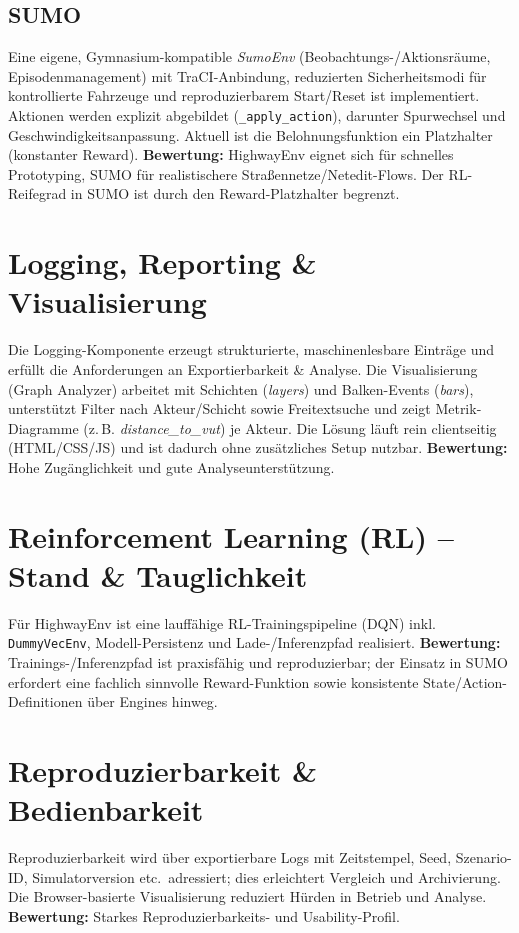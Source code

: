 \subsection*{SUMO}
Eine eigene, Gymnasium-kompatible \emph{SumoEnv} (Beobachtungs-/Aktionsräume, Episodenmanagement) mit TraCI-Anbindung, reduzierten Sicherheitsmodi für kontrollierte Fahrzeuge und reproduzierbarem Start/Reset ist implementiert.
Aktionen werden explizit abgebildet (\texttt{\_apply\_action}), darunter Spurwechsel und Geschwindigkeitsanpassung.
Aktuell ist die Belohnungsfunktion ein Platzhalter (konstanter Reward).
\textbf{Bewertung:} HighwayEnv eignet sich für schnelles Prototyping, SUMO für realistischere Straßennetze/Netedit-Flows.
Der RL-Reifegrad in SUMO ist durch den Reward-Platzhalter begrenzt.

\section{Logging, Reporting \& Visualisierung}
Die Logging-Komponente erzeugt strukturierte, maschinenlesbare Einträge und erfüllt die Anforderungen an Exportierbarkeit \& Analyse.
Die Visualisierung (Graph Analyzer) arbeitet mit Schichten (\emph{layers}) und Balken-Events (\emph{bars}), unterstützt Filter nach Akteur/Schicht sowie Freitextsuche und zeigt Metrik-Diagramme (z.\,B. \textit{distance\_to\_vut}) je Akteur.
Die Lösung läuft rein clientseitig (HTML/CSS/JS) und ist dadurch ohne zusätzliches Setup nutzbar.
\textbf{Bewertung:} Hohe Zugänglichkeit und gute Analyseunterstützung.

\section{Reinforcement Learning (RL) – Stand \& Tauglichkeit}
Für HighwayEnv ist eine lauffähige RL-Trainingspipeline (DQN) inkl. \texttt{DummyVecEnv}, Modell-Persistenz und Lade-/Inferenzpfad realisiert.
\textbf{Bewertung:} Trainings-/Inferenzpfad ist praxisfähig und reproduzierbar; der Einsatz in SUMO erfordert eine fachlich sinnvolle Reward-Funktion sowie konsistente State/Action-Definitionen über Engines hinweg.

\section{Reproduzierbarkeit \& Bedienbarkeit}
Reproduzierbarkeit wird über exportierbare Logs mit Zeitstempel, Seed, Szenario-ID, Simulatorversion etc.\ adressiert; dies erleichtert Vergleich und Archivierung.
Die Browser-basierte Visualisierung reduziert Hürden in Betrieb und Analyse.
\textbf{Bewertung:} Starkes Reproduzierbarkeits- und Usability-Profil.
